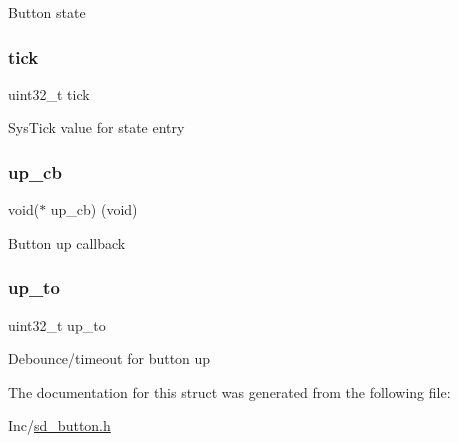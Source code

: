 Button state \mbox{\label{structsd__button_a260e06ce96c2e4deebccaedeb059dc0b}} 
\subsubsection{\texorpdfstring{tick}{tick}}
{\footnotesize\ttfamily uint32\+\_\+t tick}

Sys\+Tick value for state entry \mbox{\label{structsd__button_afc4472a8d74ec3156eae7b77bf8a256c}} 
\subsubsection{\texorpdfstring{up\+\_\+cb}{up\_cb}}
{\footnotesize\ttfamily void($\ast$ up\+\_\+cb) (void)}

Button up callback \mbox{\label{structsd__button_a92e85c4fc2f84cfa9fbed1fd60a7fac7}} 
\subsubsection{\texorpdfstring{up\+\_\+to}{up\_to}}
{\footnotesize\ttfamily uint32\+\_\+t up\+\_\+to}

Debounce/timeout for button up 

The documentation for this struct was generated from the following file\+:\begin{DoxyCompactItemize}
\item 
Inc/\mbox{\hyperlink{sd__button_8h}{sd\+\_\+button.\+h}}\end{DoxyCompactItemize}
